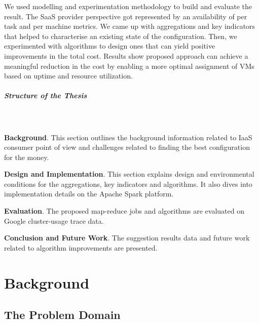 \documentclass[]{final_report}
\newcommand{\myparagraph}[1]{\paragraph{#1}\mbox{}\\}
\begin{document}

We used modelling and experimentation methodology to build and evaluate the result. The SaaS provider perspective got represented by an availability of per task and per machine metrics. We came up with aggregations and key indicators that helped to characterise an existing state of the configuration. Then, we experimented with algorithms to design ones that can yield positive improvements in the total cost.
Results show proposed approach can achieve a meaningful reduction in the cost by enabling a more optimal assignment of VMs based on uptime and resource utilization. 

\myparagraph{Structure of the Thesis}\\
\textbf{Background}. This section outlines the background information related to IaaS consumer point of view and challenges related to finding the best configuration for the money. \par
\textbf{Design and Implementation}. This section explains design and environmental conditions for the aggregations, key indicators and algorithms. It also dives into implementation details on the Apache Spark platform. \par
\textbf{Evaluation}. The proposed map-reduce jobs and algorithms are evaluated on Google cluster-usage trace data. \par
\textbf{Conclusion and Future Work}. The suggestion results data and future work related to algorithm improvements are presented. 
 
\newpage


\chapter{Background}

\section{The Problem Domain} 
\end{document}
